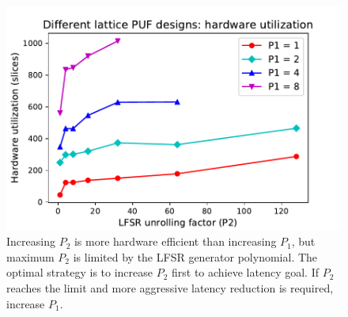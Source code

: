 \begin{figure}[t!]
\centering
\includegraphics[width = 0.8\linewidth]{./figs/design_space_hw.pdf}
\caption{Increasing $P_2$ is more hardware efficient than increasing $P_1$, but maximum $P_2$ is limited by the LFSR generator polynomial. The optimal strategy is to increase $P_2$ first to achieve latency goal. If $P_2$ reaches the limit and more aggressive latency reduction is required, increase $P_1$.}
\label{fig:design_space_hw}
\end{figure}